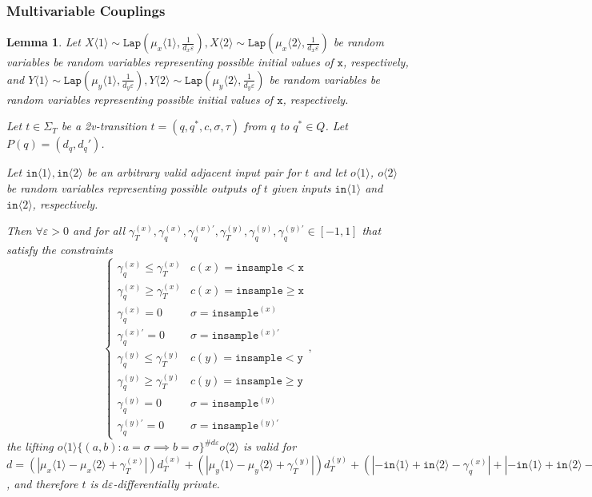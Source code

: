 \documentclass[12pt]{article}
\newcommand{\gguard}[1][x]{\texttt{insample}\geq #1}
\newcommand{\lguard}[1][x]{\texttt{insample} < #1}
\newcommand{\brangle}[1]{\langle #1 \rangle}
\newcommand{\Lap}{\texttt{Lap}}
\newtheorem{lemma}[thm]{Lemma}
\theoremstyle{definition}
\begin{document}
\subsubsection{Multivariable Couplings}

\begin{lemma}
    Let $X\brangle{1}\sim \Lap(\mu_x\brangle{1}, \frac{1}{d_x\varepsilon}), X\brangle{2}\sim\Lap(\mu_x\brangle{2}, \frac{1}{d_x\varepsilon})$ be random variables be random variables representing possible initial values of $\texttt{x}$, respectively, 
    and $Y\brangle{1}\sim \Lap(\mu_y\brangle{1}, \frac{1}{d_y\varepsilon}), Y\brangle{2}\sim\Lap(\mu_y\brangle{2}, \frac{1}{d_y\varepsilon})$ be random variables be random variables representing possible initial values of $\texttt{x}$, respectively. 

    Let $t\in \Sigma_T$ be a 2v-transition $t = (q, q^*, c, \sigma, \tau)$ from $q$ to $q^*\in Q$. Let $P(q) = (d_q, d_q')$.

    Let $\texttt{in}\brangle{1}, \texttt{in}\brangle{2}$ be an arbitrary valid adjacent input pair for $t$ and let $o\brangle{1}$, $o\brangle{2}$ be random variables representing possible outputs of $t$ given inputs $\texttt{in}\brangle{1}$ and $\texttt{in}\brangle{2}$, respectively. 

    Then $\forall \varepsilon>0$ and for all $\gamma_T^{(x)}, \gamma_q^{(x)}, \gamma_q^{(x)\prime},\gamma_T^{(y)}, \gamma_q^{(y)}, \gamma_q^{(y)\prime}\in [-1, 1]$ that satisfy the constraints \[
        \begin{cases}
          \gamma_q^{(x)}\leq\gamma_T^{(x)} & c(x) = \lguard[\texttt{x}]\\
          \gamma_q^{(x)}\geq\gamma_T^{(x)} & c(x) = \gguard[\texttt{x}]\\
          \gamma_q^{(x)}=0 & \sigma = \texttt{insample}^{(x)}\\
          \gamma_q^{(x)\prime}=0 & \sigma = \texttt{insample}^{(x)\prime}\\
          \gamma_q^{(y)}\leq\gamma_T^{(y)} & c(y) = \lguard[\texttt{y}]\\
          \gamma_q^{(y)}\geq\gamma_T^{(y)} & c(y) = \gguard[\texttt{y}]\\
          \gamma_q^{(y)}=0 & \sigma = \texttt{insample}^{(y)}\\
          \gamma_q^{(y)\prime}=0 & \sigma = \texttt{insample}^{(y)\prime}
        \end{cases},
      \]
      the lifting $o\brangle{1}\{(a, b): a=\sigma\implies b=\sigma\}^{\#d\varepsilon}o\brangle{2}$ is valid for 
      $d = (|\mu_x\brangle{1}-\mu_x\brangle{2}+\gamma_T^{(x)}|)d_T^{(x)}+(|\mu_y\brangle{1}-\mu_y\brangle{2}+\gamma_T^{(y)}|)d_T^{(y)}+(|-\texttt{in}\brangle{1}+\texttt{in}\brangle{2}-\gamma_q^{(x)}|+|-\texttt{in}\brangle{1}+\texttt{in}\brangle{2}-\gamma_q^{(y)}|)d_q+(|-\texttt{in}\brangle{1}+\texttt{in}\brangle{2}-\gamma_q^{(x)\prime}|+|-\texttt{in}\brangle{1}+\texttt{in}\brangle{2}-\gamma_q^{(y)\prime}|)d_q'$, and therefore $t$ is $d\varepsilon$-differentially private. 
\end{lemma}
\end{document}
